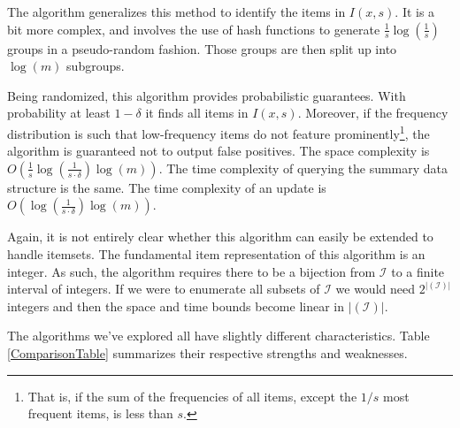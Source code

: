 \documentclass[a4paper]{article}
\begin{document}
The algorithm generalizes this method to identify the items in $I(x, s)$. It is a bit more complex, and involves the use of hash functions to generate $\frac{1}{s}\log (\frac{1}{s})$ groups in a pseudo-random fashion. Those groups are then split up into $\log(m)$ subgroups.

Being randomized, this algorithm provides probabilistic guarantees. With probability at least $1-\delta$ it finds all items in $I(x, s)$. Moreover, if the frequency distribution is such that low-frequency items do not feature prominently\footnote{That is, if the sum of the frequencies of all items, except the $1/s$ most frequent items, is less than $s$.}, the algorithm is guaranteed not to output false positives. The space complexity is $O\left(\frac{1}{s} \log\left(\frac{1}{s\cdot \delta}\right) \log(m)\right)$. The time complexity of querying the summary data structure is the same. The time complexity of an update is $O\left(\log\left(\frac{1}{s\cdot \delta}\right) \log(m)\right)$.

Again, it is not entirely clear whether this algorithm can easily be extended to handle itemsets. The fundamental item representation of this algorithm is an integer. As such, the algorithm requires there to be a bijection from $\mathcal{I}$ to a finite interval of integers. If we were to enumerate all subsets of $\mathcal{I}$ we would need $2^{|\mathcal{(I)}|}$ integers and then the space and time bounds become linear in $|\mathcal{(I)}|$.

The algorithms we've explored all have slightly different characteristics. Table \ref{ComparisonTable} summarizes their respective strengths and weaknesses.
\end{document}
